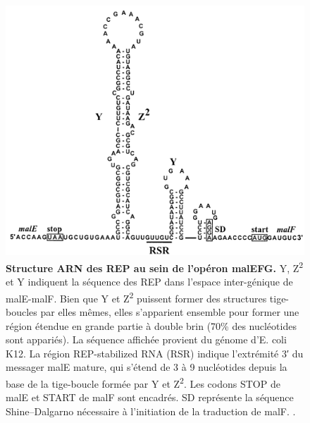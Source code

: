 \documentclass[12pt,a4paper]{report}
\begin{document}
\begin{onehalfspace}
\begin{figure}[ht]
\centerline{\includegraphics[scale=0.5]{figures/malEF_rep.png}}
\caption{\textbf{Structure ARN des REP au sein de l’opéron malEFG.} Y, Z\textsuperscript{2} et Y indiquent la séquence des REP dans l'espace inter-génique de malE-malF. Bien que Y et Z\textsuperscript{2} puissent former des structures tige-boucles par elles mêmes, elles s'apparient ensemble pour former une région étendue en grande partie à double brin (70\% des nucléotides sont appariés). La séquence affichée provient du génome d'E. coli K12. La région REP-stabilized RNA (RSR) indique l'extrémité 3′ du messager malE mature, qui s'étend de 3 à 9 nucléotides depuis la base de la tige-boucle formée par Y et Z\textsuperscript{2}. Les codons STOP de  malE et START de malF sont encadrés. SD représente la séquence Shine–Dalgarno nécessaire à l'initiation de la traduction de malF. \citep{Khemici2004}.}
\label{fig:malEF_rep} 
\end{figure}


\end{onehalfspace}
\end{document}
